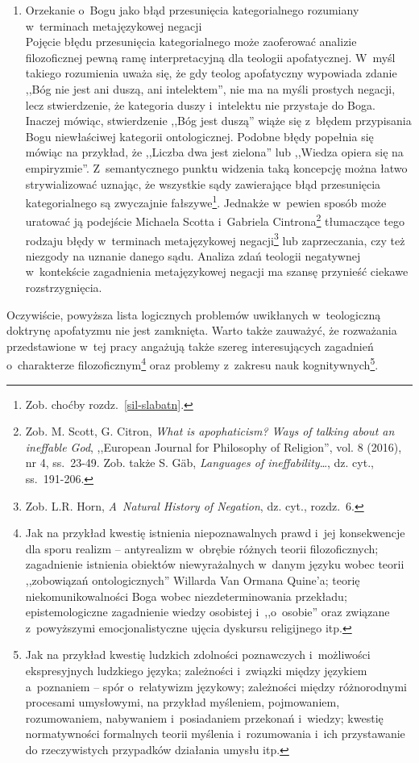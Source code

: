 \begin{enumerate}[label = \arabic*), itemindent=6mm, labelwidth=4mm, labelsep=2mm, itemsep=1em, leftmargin=0mm]
\item Orzekanie o~Bogu jako błąd przesunięcia kategorialnego rozumiany w~terminach metajęzykowej negacji\\
Pojęcie błędu przesunięcia kategorialnego może zaoferować analizie filozoficznej pewną ramę interpretacyjną dla teologii apofatycznej. W~myśl takiego rozumienia uważa się, że gdy teolog apofatyczny wypowiada zdanie ,,Bóg nie jest ani duszą, ani intelektem'', nie ma na myśli prostych negacji, lecz stwierdzenie, że kategoria duszy i~intelektu nie przystaje do Boga. Inaczej mówiąc, stwierdzenie ,,Bóg jest duszą'' wiąże się z~błędem przypisania Bogu niewłaściwej kategorii ontologicznej. Podobne błędy popełnia się mówiąc na przykład, że ,,Liczba dwa jest zielona'' lub ,,Wiedza opiera się na empiryzmie''. Z~semantycznego punktu widzenia taką koncepcję można łatwo strywializować uznając, że wszystkie sądy zawierające błąd przesunięcia kategorialnego są zwyczajnie fałszywe\footnote{Zob. choćby rozdz.~\ref{sil-slabatn}.}. Jednakże w~pewien sposób może uratować ją podejście Michaela Scotta i~Gabriela Cintrona\footnote{Zob. M. Scott, G. Citron, \textit{What is apophaticism? Ways of talking about an ineffable God}, ,,European Journal for Philosophy of Religion'', vol. 8 (2016), nr 4, ss.~23-49. Zob. także S. Gäb, \textit{Languages of ineffability}…, dz. cyt., ss.~191-206.} tłumaczące tego rodzaju błędy w~terminach metajęzykowej negacji\footnote{Zob. L.R. Horn, \textit{A~Natural History of Negation}, dz. cyt., rozdz.~6.} lub zaprzeczania, czy też niezgody na uznanie danego sądu. Analiza zdań teologii negatywnej w~kontekście zagadnienia metajęzykowej negacji ma szansę przynieść ciekawe rozstrzygnięcia.
\end{enumerate}

Oczywiście, powyższa lista logicznych problemów uwikłanych w~teologiczną doktrynę apofatyzmu nie jest zamknięta. Warto także zauważyć, że rozważania przedstawione w~tej pracy angażują także szereg interesujących zagadnień o~charakterze filozoficznym\footnote{Jak na przykład kwestię istnienia niepoznawalnych prawd i~jej konsekwencje dla sporu realizm -- antyrealizm w~obrębie różnych teorii filozoficznych; zagadnienie istnienia obiektów niewyrażalnych w~danym języku wobec teorii ,,zobowiązań ontologicznych'' Willarda Van Ormana Quine'a; teorię niekomunikowalności Boga wobec niezdeterminowania przekładu; epistemologiczne zagadnienie wiedzy osobistej i~,,o~osobie'' oraz związane z~powyższymi emocjonalistyczne ujęcia dyskursu religijnego itp.} oraz problemy z~zakresu nauk kognitywnych\footnote{Jak na przykład kwestię ludzkich zdolności poznawczych i~możliwości ekspresyjnych ludzkiego języka; zależności i~związki między językiem a~poznaniem -- spór o~relatywizm językowy; zależności między różnorodnymi procesami umysłowymi, na przykład myśleniem, pojmowaniem, rozumowaniem, nabywaniem i~posiadaniem przekonań i~wiedzy; kwestię normatywności formalnych teorii myślenia i~rozumowania i~ich przystawanie do rzeczywistych przypadków działania umysłu itp.}.

